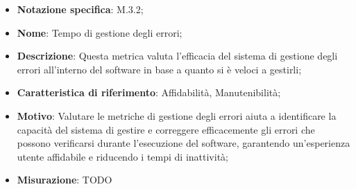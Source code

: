 \begin{itemize}
    \item \textbf{Notazione specifica}: M.3.2;
    \item \textbf{Nome}: Tempo di gestione degli errori;
    \item \textbf{Descrizione}: Questa metrica valuta l'efficacia del sistema di gestione degli errori all'interno del software in base a quanto si è veloci a gestirli;
    \item \textbf{Caratteristica di riferimento}: Affidabilità, Manutenibilità;
    \item \textbf{Motivo}: Valutare le metriche di gestione degli errori aiuta a identificare la capacità del sistema di gestire e correggere efficacemente gli errori che possono verificarsi durante l'esecuzione del software, garantendo un'esperienza utente affidabile e riducendo i tempi di inattività;
    \item \textbf{Misurazione}: TODO
\end{itemize}

